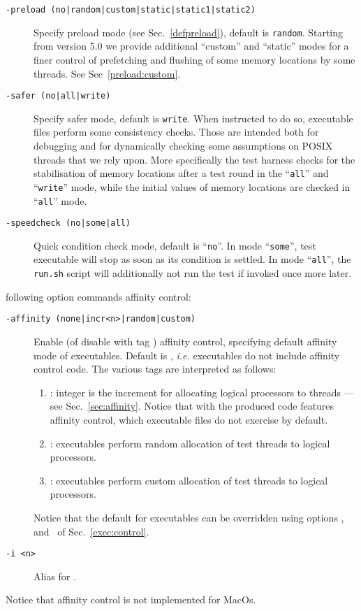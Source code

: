 \begin{description}
\item[{\tt -preload (no|random|custom|static|static1|static2)}]
Specify preload mode (see Sec.~\ref{defpreload}), default is \texttt{random}.
Starting from version 5.0 we provide additional ``custom'' and ``static''
modes for a finer control of prefetching and flushing of some memory locations
by some threads. See Sec~\ref{preload:custom}.
\item[{\tt -safer (no|all|write)}] Specify safer mode,
default is \texttt{write}.
When instructed to do so, executable files perform some consistency checks.
Those are intended both for debugging and for dynamically checking
some assumptions on POSIX threads that we rely upon.
More specifically the test harness checks for the stabilisation of
memory locations after a test round in the ``\texttt{all}'' and
``\texttt{write}'' mode, while
the initial values of memory locations are checked in ``\texttt{all}'' mode.
\item[{\tt -speedcheck (no|some|all)}] 
Quick condition check mode,
default is ``\texttt{no}''.
In mode ``\texttt{some}'', test executable will stop as soon as its
condition is settled.
In mode ``\texttt{all}'', the \texttt{run.sh} script will additionally
not run the test if invoked once more later.
\end{description}

 following option commands affinity control:
\begin{description}
\item[{\tt -affinity (none|incr<n>|random|custom)}]
Enable (of disable with tag ) affinity control,
specifying default affinity mode of executables.
Default is , \emph{i.e.} executables do not
include affinity control code.
The various tags are interpreted as follows:
\begin{enumerate}
\item {}:
integer  is the increment  for allocating logical
processors to threads --- see Sec.~\ref{sec:affinity}.
Notice that with 
the produced code features affinity control, which executable
files do not exercise by default.
\item {}: executables perform random allocation of
test threads to logical processors.
\item {}: executables perform custom allocation of
test threads to logical processors.
\end{enumerate}
Notice that the default for executables can be overridden using
options , and~
of Sec.~\ref{exec:control}.

\item[{\tt -i <n>}] Alias for .
\end{description}
Notice that affinity control is not implemented for MacOs.

